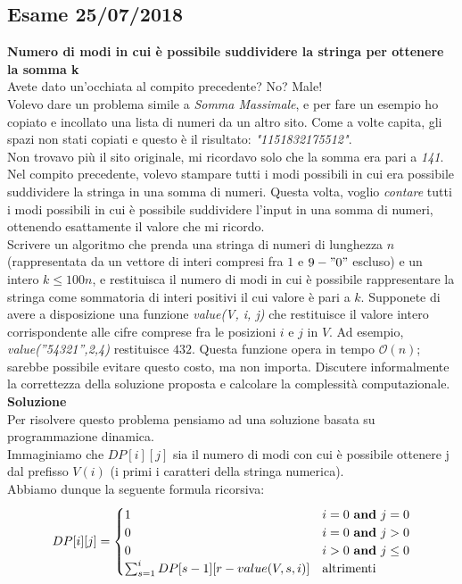 \documentclass[../cheatSheetAlgoritmi.tex]{subfiles}
\begin{document}
\subsection{Esame 25/07/2018}
\textbf{Numero di modi in cui è possibile suddividere la stringa per ottenere la somma k} \\
Avete dato un'occhiata al compito precedente? No? Male! \\
Volevo dare un problema simile a \emph{Somma Massimale}, e per fare un esempio ho copiato e incollato una lista di numeri da un altro sito. 
Come a volte capita, gli spazi non stati copiati e questo è il risultato: \emph{"1151832175512"}.  \\
Non trovavo più il sito originale, mi ricordavo solo che la somma era pari a \emph{141}. Nel compito precedente, volevo stampare tutti i modi possibili in cui era possibile suddividere la stringa in una somma di numeri. Questa volta, voglio \emph{contare} tutti i modi possibili in cui è possibile suddividere l'input in una somma di numeri, ottenendo esattamente il valore che mi ricordo. \\
Scrivere un algoritmo che prenda una stringa di numeri di lunghezza $n$ (rappresentata da un vettore di interi compresi fra $1$ e $9 - "0"$ escluso) e un intero $k \leq 100n$, e restituisca il numero di modi in cui è possibile rappresentare la stringa come sommatoria di interi positivi il cui valore è pari a $k$. Supponete di avere a disposizione una funzione \emph{value(V, i, j)} che  restituisce  il  valore  intero  corrispondente  alle  cifre comprese  fra  le  posizioni $i$ e $j$ in $V$. Ad  esempio, \emph{value(”54321”,2,4)} restituisce $432$.  
Questa funzione opera in tempo $\mathcal{O}(n)$; sarebbe possibile evitare questo costo, ma non importa. Discutere informalmente la correttezza della soluzione proposta e calcolare la complessità computazionale. \\
\textbf{Soluzione} \\
Per risolvere questo problema pensiamo ad una soluzione basata su programmazione dinamica. \\ 
Immaginiamo che $DP[i][j]$ sia il numero di modi con cui è possibile ottenere j dal prefisso $V(i)$ (i primi i caratteri della stringa numerica). \\ 
Abbiamo dunque la seguente formula ricorsiva: 
\begin{equation*}
  	DP[i][j] =\begin{cases}
    	1 & \text{$i = 0$ \textbf{and} $j = 0$}\\
    	0 & \text{$i = 0$ \textbf{and} $j > 0$}\\
    	0 & \text{$i > 0$ \textbf{and} $j \leq 0$}\\
    	\sum_{s = 1}^{i} DP[s - 1][r - value(V, s, i)] & \text{altrimenti}
  	\end{cases}
\end{equation*}
\end{document}
